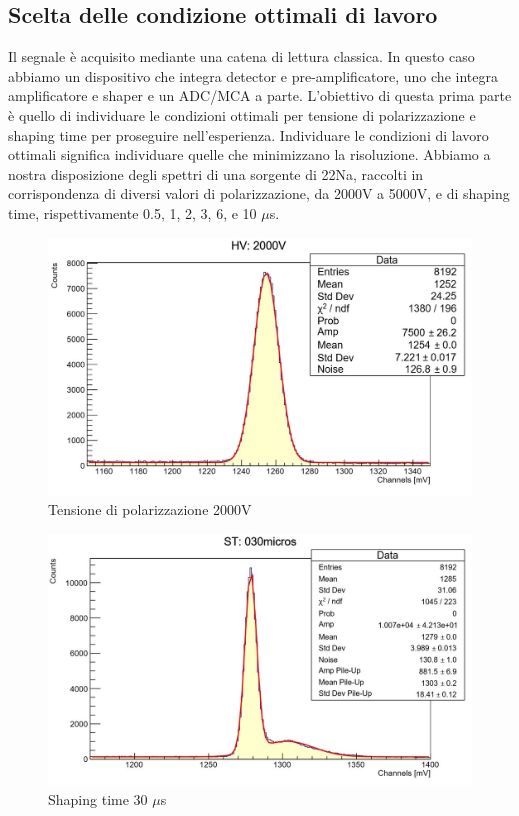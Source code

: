 \documentclass[a4paper,10pt]{article}
\begin{document}
\subsection{Scelta delle condizione ottimali di lavoro}
Il segnale è acquisito mediante una catena di lettura classica. In questo caso abbiamo un dispositivo che integra detector e pre-amplificatore, uno che integra amplificatore e shaper e un ADC/MCA a parte. L'obiettivo di questa prima parte è quello di individuare le condizioni ottimali per tensione di polarizzazione e shaping time per proseguire nell'esperienza. Individuare le condizioni di lavoro ottimali significa individuare quelle che minimizzano la risoluzione. Abbiamo a nostra disposizione degli spettri di una sorgente di 22Na, raccolti in corrispondenza di diversi valori di polarizzazione, da 2000V a 5000V, e di shaping time, rispettivamente 0.5, 1, 2, 3, 6, e 10 $\mu$s. 

\begin{figure}[h!]
    \centering
    \includegraphics[scale=0.45]{grafici/hv}
    \caption{Tensione di polarizzazione 2000V}
\end{figure}

\begin{figure}[h!]
    \centering
    \includegraphics[scale=0.45]{grafici/st}
    \caption{Shaping time 30 $\mu$s}
\end{figure}
\end{document}
